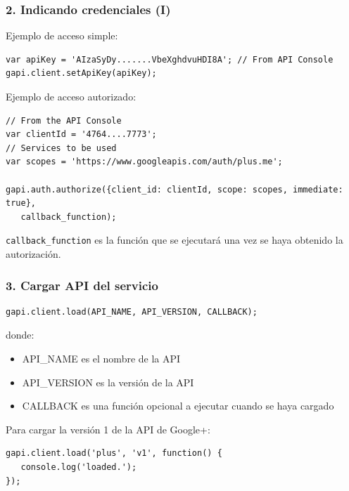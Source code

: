 \begin{frame}[fragile]
\frametitle{2. Indicando credenciales (I)}

Ejemplo de acceso simple:

\begin{footnotesize}
\begin{verbatim}
var apiKey = 'AIzaSyDy.......VbeXghdvuHDI8A'; // From API Console
gapi.client.setApiKey(apiKey);
\end{verbatim}
\end{footnotesize}

Ejemplo de acceso autorizado:

\begin{footnotesize}
\begin{verbatim}
// From the API Console
var clientId = '4764....7773'; 
// Services to be used
var scopes = 'https://www.googleapis.com/auth/plus.me'; 

gapi.auth.authorize({client_id: clientId, scope: scopes, immediate: true},
   callback_function);
\end{verbatim}
\end{footnotesize}

\texttt{callback\_function} es la función que se ejecutará una vez se haya obtenido
la autorización.

\end{frame}


\begin{frame}[fragile]
\frametitle{3. Cargar API del servicio}

\begin{verbatim}
gapi.client.load(API_NAME, API_VERSION, CALLBACK);
\end{verbatim}

donde:

\begin{itemize}
  \item API\_NAME es el nombre de la API
  \item API\_VERSION es la versión de la API
  \item CALLBACK es una función opcional a ejecutar cuando se haya cargado
\end{itemize}

Para cargar la versión 1 de la API de Google+:

\begin{verbatim}
gapi.client.load('plus', 'v1', function() {
   console.log('loaded.'); 
});
\end{verbatim}

\end{frame}



